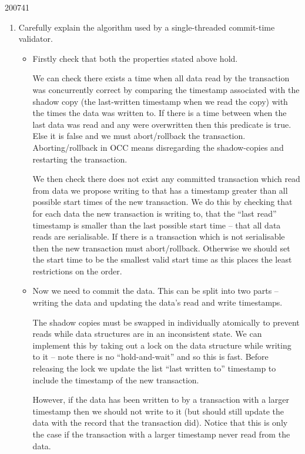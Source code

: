 \documentclass[10pt,\jkfside,a4paper]{article}
\begin{document}
\begin{examquestion}{2007}{4}{1}
\begin{enumerate}[label=(\alph*)]
\begin{enumerate}[label=(\roman*)]
\begin{itemize}
\end{itemize}

\item Carefully explain the algorithm used by a single-threaded commit-time
validator.

\begin{itemize}

\item Firstly check that both the properties stated above hold.

We can check there exists a time when all data read by the transaction
was concurrently correct by comparing the timestamp associated with the
shadow copy (the last-written timestamp when we read the copy) with the
times the data was written to. If there is a time between when the last data
was read and any were overwritten then this predicate is true. Else it
is false and we must abort/rollback the transaction. Aborting/rollback in
OCC means disregarding the shadow-copies and restarting the transaction.

We then check there does not exist any committed transaction which read from
data we propose writing to that has a timestamp greater than all possible
start times of the new transaction. We do this by checking that for each data
the new transaction is writing to, that the ``last read'' timestamp is
smaller than the last possible start time -- that all data reads are
serialisable. If there is a transaction which is not serialisable then the
new transaction  must abort/rollback. Otherwise we should set the start time
to be the smallest valid start time as this places the least restrictions on
the order.

\item Now we need to commit the data. This can be split into two parts --
writing the data and updating the data's read and write timestamps.

The shadow copies must be swapped in individually atomically to prevent
reads while data structures are in an inconsistent state. We can implement
this by taking out a lock on the data structure while writing to it -- note
there is no ``hold-and-wait'' and so this is fast. Before releasing the lock
we update the list ``last written to'' timestamp to include the timestamp
of the new transaction.

However, if the data has been written to by a transaction with a larger
timestamp then we should not write to it (but should still update the data
with the record that the transaction did). Notice that this is only the case
if the transaction with a larger timestamp never read from the data.


\end{itemize}
\end{enumerate}
\end{enumerate}
\end{examquestion}
\end{document}
